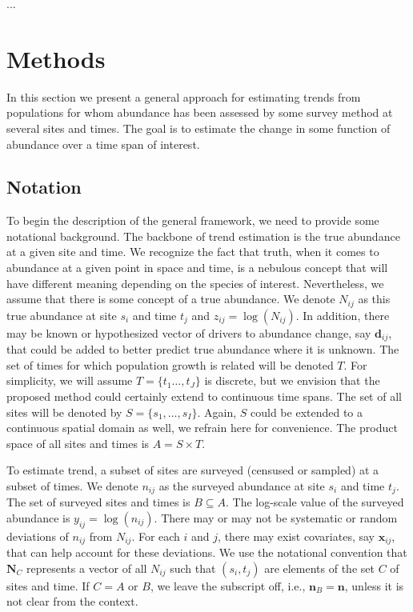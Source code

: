 \documentclass[12pt,letter,draft]{article}
\newcommand{\Nij}{\ensuremath{N_{ij}}}
\newcommand{\nij}{\ensuremath{n_{ij}}}
\newcommand{\zij}{\ensuremath{z_{ij}}}
\newcommand{\yij}{\ensuremath{y_{ij}}}
\newcommand{\bx}{\ensuremath{\mathbf{x}}}
\begin{document}
...
   
\section{Methods}

In this section we present a general approach for estimating trends from populations for whom abundance has been assessed by some survey method at several sites and times. The goal is to estimate the change in some function of abundance over a time span of interest. 

\subsection{Notation}

To begin the description of the general framework, we need to provide some notational background. The backbone of trend estimation is the true abundance at a given site and time. We recognize the fact that truth, when it comes to abundance at a given point in space and time, is a nebulous concept that will have different meaning depending on the species of interest. Nevertheless, we assume that there is some concept of a true abundance. We denote $\Nij$ as this true abundance at site $s_i$ and time $t_j$ and $\zij=\log(\Nij)$. In addition, there may be known or hypothesized vector of drivers to abundance change, say $\mathbf{d}_{ij}$, that could be added to better predict true abundance where it is unknown. The set of times for which population growth is related will be denoted $T$. For simplicity, we will assume $T = \{t_1\dots,t_J\}$ is discrete, but we envision that the proposed method could certainly extend to continuous time spans.  The set of all sites will be denoted by $S = \{s_1,\dots,s_I\} $. Again, $S$ could be extended to a continuous spatial domain as well, we refrain here for convenience. The product space of all sites and times is $A = S \times T$.

To estimate trend, a subset of sites are surveyed (censused or sampled) at a subset of times. We denote $\nij$ as the surveyed abundance at site $s_i$ and time $t_j$. The set of surveyed sites and times is $B\subseteq A$. The log-scale value of the surveyed abundance is $\yij=\log(\nij)$. There may or may not be systematic or random deviations of $\nij$ from $\Nij$. For each $i$ and $j$, there may exist covariates, say $\bx_{ij}$, that can help account for these deviations. We use the notational convention that $\mathbf{N}_C$ represents a vector of all $\Nij$ such that $(s_i, t_j)$ are elements of the set $C$ of sites and time. If $C=A$ or $B$, we leave the subscript off, i.e., $\mathbf{n}_B = \mathbf{n}$, unless it is not clear from the context.
\end{document}
